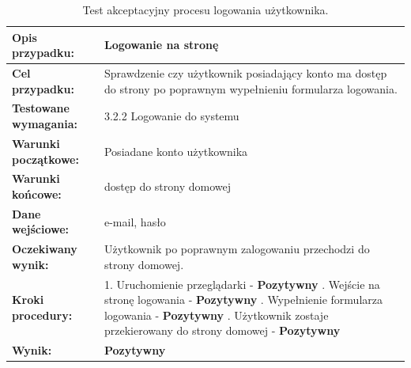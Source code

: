 \begin{table}[ht]
\centering
\begin{tabularx}{\textwidth}{|>{\raggedright\arraybackslash}p{}|X|}
    \hline
    \textbf{Opis przypadku:} & Logowanie na stronę \\
    \hline
    \textbf{Cel przypadku:} & Sprawdzenie czy użytkownik posiadający konto ma dostęp do strony po poprawnym wypełnieniu formularza logowania. \\
    \hline
    \textbf{Testowane wymagania:} & 3.2.2 Logowanie do systemu \\
    \hline
    \textbf{Warunki początkowe:} & Posiadane konto użytkownika \\
    \hline
    \textbf{Warunki końcowe:} & dostęp do strony domowej \\
    \hline
    \textbf{Dane wejściowe:} & e-mail, hasło \\
    \hline
    \textbf{Oczekiwany wynik:} & Użytkownik po poprawnym zalogowaniu przechodzi do strony domowej. \\
    \hline
    \textbf{Kroki procedury:} &
        1. Uruchomienie przeglądarki - \textbf{Pozytywny} \newline
        2. Wejście na stronę logowania - \textbf{Pozytywny} \newline
        3. Wypełnienie formularza logowania - \textbf{Pozytywny} \newline
        4. Użytkownik zostaje przekierowany do strony domowej - \textbf{Pozytywny} \\
    \hline
    \textbf{Wynik:} & \textbf{Pozytywny} \\
    \hline
\end{tabularx}
    \caption{Test akceptacyjny procesu logowania użytkownika.}
\end{table}


